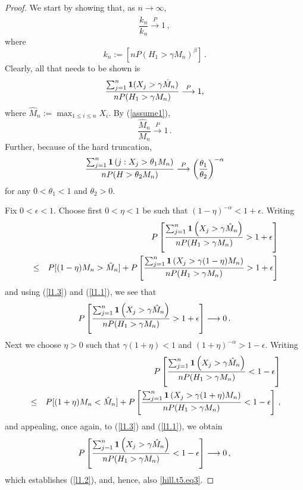 \documentclass[11pt]{amsart}
\numberwithin{equation}{section}
\begin{document}
\begin{proof}
We start by showing  that, as $n\longrightarrow\infty$,
\begin{equation}\label{hill.t5.eq3}
\frac{\hat k_n}{k_n}{\stackrel{P}{\longrightarrow}}1\,,
\end{equation}
where
$$
k_n:=\left[nP(H_1>\gamma M_n)^\beta\right]\,.
$$
Clearly, all that needs to be shown is
\begin{equation}\label{l1.2}
\frac{\sum_{j=1}^n{{\bf 1}}(X_{j}>\gamma\hat M_n)}{nP(H_1>\gamma
  M_n)}\stackrel P\longrightarrow1, 
\end{equation}
where $\hat M_n:=\max_{1\le i\le n}X_{i}$. By (\ref{assume1}), 
\begin{equation}\label{l1.3}
\frac{\hat M_n}{M_n}\stackrel P\longrightarrow1\,.
\end{equation}
Further, because of the hard truncation, 
\begin{equation}\label{l1.1}
\frac{\sum_{j=1}^n{{\bf 1}}\left(j:X_{j}>\theta_1M_n\right)}{nP(H>\theta_2M_n)}
\stackrel
P\longrightarrow\left(\frac{\theta_1}{\theta_2}\right)^{-\alpha}  
\end{equation}
for any $0<\theta_1<1$ and $\theta_2>0$. 

Fix $0<\epsilon<1$. Choose first $0<\eta<1$ be such that
$(1-\eta)^{-\alpha}<1+\epsilon$. Writing 
\begin{eqnarray*}
&&P\left[\frac{\sum_{j=1}^n{{\bf 1}}\left(X_{j}>\gamma \hat
      M_n\right)}{nP(H_1>\gamma  M_n)}>1+\epsilon\right]\\ 
&\le&P[(1-\eta)M_n>\hat
    M_n]+P\left[\frac{\sum_{j=1}^n{{\bf 1}}\left(X_{j}>\gamma (1-\eta)
      M_n\right)}{nP(H_1>\gamma  M_n)}>1+\epsilon\right]
\end{eqnarray*}
and using (\ref{l1.3}) and (\ref{l1.1}), we see that 
$$
P\left[\frac{\sum_{j=1}^n{{\bf 1}}\left(X_{j}>\gamma \hat
    M_n\right)}{nP(H_1>\gamma
    M_n)}>1+\epsilon\right]\longrightarrow0\,.
$$ 
Next we choose $\eta>0$ such that $\gamma(1+\eta)<1$ and
$(1+\eta)^{-\alpha}>1-\epsilon$. Writing 
\begin{eqnarray*}
&&P\left[\frac{\sum_{j=1}^n{{\bf 1}}\left(X_{j}>\gamma \hat
      M_n\right)}{nP(H_1>\gamma  M_n)}<1-\epsilon\right]\\ 
&\le&P[(1+\eta)M_n<\hat
    M_n]+P\left[\frac{\sum_{j=1}^n{{\bf 1}}\left(X_{j}>\gamma (1+\eta)
      M_n\right)}{nP(H_1>\gamma  M_n)}<1-\epsilon\right]\,, 
\end{eqnarray*}
and appealing, once again, to (\ref{l1.3}) and (\ref{l1.1}), we obtain 
\begin{eqnarray*}
P\left[\frac{\sum_{j=1}^n{{\bf 1}}\left(X_{j}>\gamma \hat
    M_n\right)}{nP(H_1>\gamma  M_n)}<1-\epsilon\right]\longrightarrow0\,, 
\end{eqnarray*}
which establishes (\ref{l1.2}), and, hence, also \eqref{hill.t5.eq3}.


\end{proof}
\end{document}
